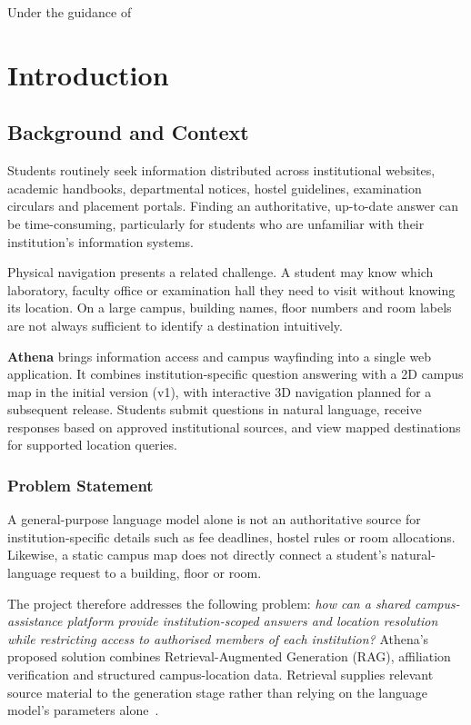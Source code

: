 \documentclass{tietreport}
\author{%
  \texttt{1024030219} Armandeep Singh Taggar \\
  \texttt{1024031048} Sanchit Narula \\
  \texttt{1024031169} Nipun Gupta}
\makeatletter
\renewcommand{\maketitle}{%
    \begin{titlepage}
      \centering
      {\large\bfseries\reportheader\par}
      \vspace{2cm}
      {\Huge\bfseries\reporttitle\par}
      \vspace{0.7cm}
      {\Large\reportsubtitle\par}
      \vspace{1.5cm}
      {\large\@author\par}
      \vspace{0.7cm}
      \reportsubtext\par
      \vspace{1.2cm}
      {\small Under the guidance of\par}
      \vspace{0.2cm}
      {\large\reportadvisor\par}
      \vfill
      \reportfooter\par
    \end{titlepage}%
  }
\makeatother
\begin{document}
\hypersetup{pageanchor=false}
\maketitle
{}
\hypersetup{pageanchor=true}
\tableofcontents
\clearpage
{}

\chapter{Introduction}

\section{Background and Context}

Students routinely seek information distributed across institutional websites,
academic handbooks, departmental notices, hostel guidelines, examination
circulars and placement portals. Finding an authoritative, up-to-date answer
can be time-consuming, particularly for students who are unfamiliar with their
institution's information systems.

Physical navigation presents a related challenge. A student may know which
laboratory, faculty office or examination hall they need to visit without
knowing its location. On a large campus, building names, floor numbers and room
labels are not always sufficient to identify a destination intuitively.

\textbf{Athena} brings information access and campus wayfinding into a single
web application. It combines institution-specific question answering with a
2D campus map in the initial version (v1), with interactive 3D navigation
planned for a subsequent release. Students submit questions in natural
language, receive responses based on approved institutional sources, and view
mapped destinations for supported location queries.

\subsection{Problem Statement}

A general-purpose language model alone is not an authoritative source for
institution-specific details such as fee deadlines, hostel rules or room
allocations. Likewise, a static campus map does not directly connect a student's
natural-language request to a building, floor or room.

The project therefore addresses the following problem: \emph{how can a shared
campus-assistance platform provide institution-scoped answers and location
resolution while restricting access to authorised members of each institution?}
Athena's proposed solution combines Retrieval-Augmented Generation (RAG),
affiliation verification and structured campus-location data. Retrieval supplies
relevant source material to the generation stage rather than relying on the
language model's parameters alone~\cite{lewis2020rag}.
\end{document}
